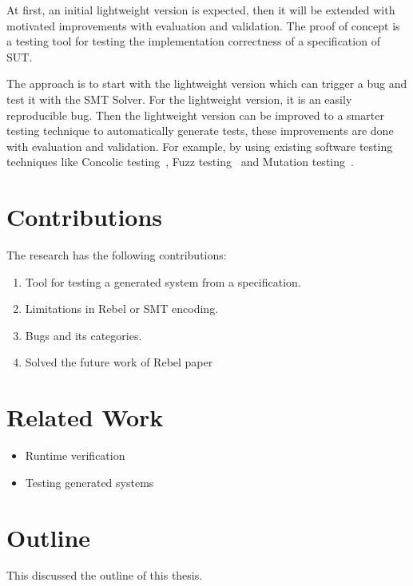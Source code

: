 At first, an initial lightweight version is expected, then it will be extended with motivated
improvements with evaluation and validation. The proof of concept is a testing
tool for testing the implementation correctness of a specification of SUT.

The
approach is to start with the lightweight version which can trigger a bug and
test it with the SMT Solver. For the lightweight version, it is an easily
reproducible bug. Then the lightweight version can be improved to a smarter
testing technique to automatically generate tests, these improvements are done
with evaluation and validation. For example, by using existing software testing
techniques like Concolic testing~\cite{sen2007concolic}, Fuzz testing~\cite{godefroid2008automated} and Mutation testing~\cite{jia2011analysis}.

\section{Contributions}
The research has the following contributions:

\begin{enumerate}
  \item Tool for testing a generated system from a specification.
  \item Limitations in Rebel or SMT encoding.
  \item Bugs and its categories.
  \item Solved the future work of Rebel paper
\end{enumerate}

\section{Related Work}
\begin{itemize}
  \item Runtime verification
  \item Testing generated systems
\end{itemize}

\section{Outline}
This discussed the outline of this thesis.
